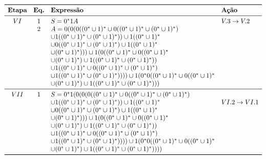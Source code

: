 \documentclass[12pt]{article}
\begin{document}
\begin{tcolorbox}[breakable,rounded corners, colback=yellow!5, colframe=red!40!black, title={Extração de expressão regular $\mathcal{R}_2$ da gramática $G_2$, tal que $\mathcal{L}(\mathcal{R}_2)=\mathcal{L}(G_2)$}]
  $$
  \begin{array}{ccll}
  \toprule
  \textbf{Etapa} & \textbf{Eq.} & \textbf{Expressão} & \textbf{Ação}\\
  \midrule
    VI & 1 & S = 0^*1A               &V.3\to V.2\\
      & 2 & A = 0(0(0((0^*\cup1)^* \cup 0((0^*\cup1)^* \cup (0^*\cup1)^*) &\\
      & &\cup 1((0^*\cup1)^* \cup (0^*\cup1)^*))\cup 1((0^*\cup1)^* &\\
      & & \cup 0((0^*\cup1)^* \cup (0^*\cup1)^*) \cup 1((0^*\cup1)^* &\\
      & & \cup (0^*\cup1)^*))) \cup 1(0((0^*\cup1)^* \cup 0((0^*\cup1)^* &\\
      & &\cup (0^*\cup1)^*)\cup 1((0^*\cup1)^* \cup (0^*\cup1)^*)) &\\
      & &\cup 1((0^*\cup1)^* \cup 0((0^*\cup1)^* \cup (0^*\cup1)^*) &\\
      & &\cup 1((0^*\cup1)^* \cup (0^*\cup1)^*)))) \cup 1(0^*0((0^*\cup1)^* \cup 0((0^*\cup1)^* &\\
      & &\cup (0^*\cup1)^*) \cup 1((0^*\cup1)^* \cup (0^*\cup1)^*)))               &\\
      \midrule
      VII & 1 & S = 0^*1(0(0(0((0^*\cup1)^* \cup 0((0^*\cup1)^* \cup (0^*\cup1)^*) &\\
      & &\cup 1((0^*\cup1)^* \cup (0^*\cup1)^*))\cup 1((0^*\cup1)^* &VI.2\to VI.1\\
      & & \cup 0((0^*\cup1)^* \cup (0^*\cup1)^*) \cup 1((0^*\cup1)^* &\\
      & & \cup (0^*\cup1)^*))) \cup 1(0((0^*\cup1)^* \cup 0((0^*\cup1)^* &\\
      & &\cup (0^*\cup1)^*)\cup 1((0^*\cup1)^* \cup (0^*\cup1)^*)) &\\
      & &\cup 1((0^*\cup1)^* \cup 0((0^*\cup1)^* \cup (0^*\cup1)^*) &\\
      & &\cup 1((0^*\cup1)^* \cup (0^*\cup1)^*)))) \cup 1(0^*0((0^*\cup1)^* \cup 0((0^*\cup1)^* &\\
      & &\cup (0^*\cup1)^*) \cup 1((0^*\cup1)^* \cup (0^*\cup1)^*))) )               &\\
  \bottomrule
  \end{array}
  $$
\end{tcolorbox}
\end{document}
